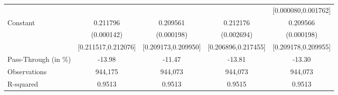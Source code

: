{\begin{tabular}{l*{4}{c}}
                    &                     &                     &                     &[0.000080,0.001762]         \\
Constant            &    0.211796\sym{***}&    0.209561\sym{***}&    0.212176\sym{***}&    0.209566\sym{***}\\
                    &  (0.000142)         &  (0.000198)         &  (0.002694)         &  (0.000198)         \\
                    &[0.211517,0.212076]         &[0.209173,0.209950]         &[0.206896,0.217455]         &[0.209178,0.209955]         \\
\midrule
Pass-Through (in \%)&      -13.98         &      -11.47         &      -13.81         &      -13.30         \\
Observations        &     944,175         &     944,073         &     944,073         &     944,073         \\
R-squared           &      0.9513         &      0.9513         &      0.9515         &      0.9513         \\
\bottomrule
\end{tabular}
}
